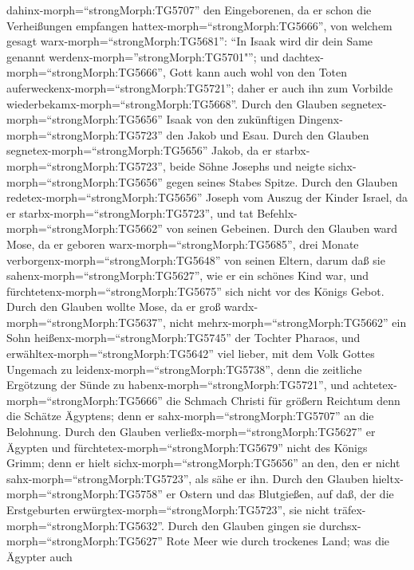 dahinx-morph=``strongMorph:TG5707'' den Eingeborenen, da er schon die
Verheißungen empfangen hattex-morph=``strongMorph:TG5666'',
 von welchem gesagt warx-morph=``strongMorph:TG5681'': ``In
Isaak wird dir dein Same genannt werdenx-morph=''strongMorph:TG5701"'';
 und dachtex-morph=``strongMorph:TG5666'', Gott kann auch
wohl von den Toten auferweckenx-morph=``strongMorph:TG5721''; daher er
auch ihn zum Vorbilde wiederbekamx-morph=``strongMorph:TG5668''.
 Durch den Glauben segnetex-morph=``strongMorph:TG5656''
Isaak von den zukünftigen Dingenx-morph=``strongMorph:TG5723'' den Jakob
und Esau.  Durch den Glauben
segnetex-morph=``strongMorph:TG5656'' Jakob, da er
starbx-morph=``strongMorph:TG5723'', beide Söhne Josephs und neigte
sichx-morph=``strongMorph:TG5656'' gegen seines Stabes Spitze.
 Durch den Glauben redetex-morph=``strongMorph:TG5656''
Joseph vom Auszug der Kinder Israel, da er
starbx-morph=``strongMorph:TG5723'', und tat
Befehlx-morph=``strongMorph:TG5662'' von seinen Gebeinen. 
Durch den Glauben ward Mose, da er geboren
warx-morph=``strongMorph:TG5685'', drei Monate
verborgenx-morph=``strongMorph:TG5648'' von seinen Eltern, darum daß sie
sahenx-morph=``strongMorph:TG5627'', wie er ein schönes Kind war, und
fürchtetenx-morph=``strongMorph:TG5675'' sich nicht vor des Königs
Gebot.  Durch den Glauben wollte Mose, da er groß
wardx-morph=``strongMorph:TG5637'', nicht
mehrx-morph=``strongMorph:TG5662'' ein Sohn
heißenx-morph=``strongMorph:TG5745'' der Tochter Pharaos, 
und erwähltex-morph=``strongMorph:TG5642'' viel lieber, mit dem Volk
Gottes Ungemach zu leidenx-morph=``strongMorph:TG5738'', denn die
zeitliche Ergötzung der Sünde zu habenx-morph=``strongMorph:TG5721'',
 und achtetex-morph=``strongMorph:TG5666'' die Schmach
Christi für größern Reichtum denn die Schätze Ägyptens; denn er
sahx-morph=``strongMorph:TG5707'' an die Belohnung.  Durch
den Glauben verließx-morph=``strongMorph:TG5627'' er Ägypten und
fürchtetex-morph=``strongMorph:TG5679'' nicht des Königs Grimm; denn er
hielt sichx-morph=``strongMorph:TG5656'' an den, den er nicht
sahx-morph=``strongMorph:TG5723'', als sähe er ihn.  Durch
den Glauben hieltx-morph=``strongMorph:TG5758'' er Ostern und das
Blutgießen, auf daß, der die Erstgeburten
erwürgtex-morph=``strongMorph:TG5723'', sie nicht
träfex-morph=``strongMorph:TG5632''.  Durch den Glauben
gingen sie durchsx-morph=``strongMorph:TG5627'' Rote Meer wie durch
trockenes Land; was die Ägypter auch
